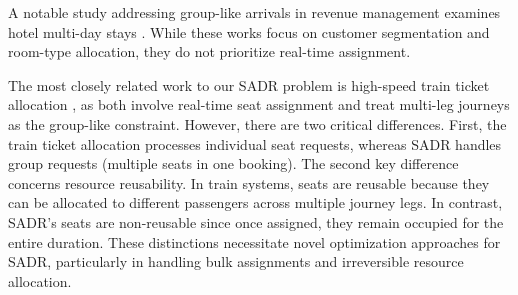  

A notable study addressing group-like arrivals in revenue management examines hotel multi-day stays \citep{bitran1995application, goldman2002models, aydin2018decomposition}. While these works focus on customer segmentation and room-type allocation, they do not prioritize real-time assignment.


The most closely related work to our SADR problem is high-speed train ticket allocation \citep{zhu2023assign}, as both involve real-time seat assignment and treat multi-leg journeys as the group-like constraint. However, there are two critical differences. First, the train ticket allocation processes individual seat requests, whereas SADR handles group requests (multiple seats in one booking). The second key difference concerns resource reusability. In train systems, seats are reusable because they can be allocated to different passengers across multiple journey legs. In contrast, SADR's seats are non-reusable since once assigned, they remain occupied for the entire duration. These distinctions necessitate novel optimization approaches for SADR, particularly in handling bulk assignments and irreversible resource allocation.








